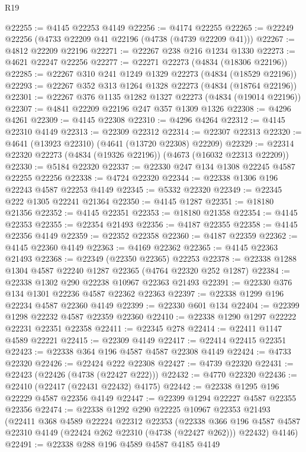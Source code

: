\begin{lexlean}{R19}
\begin{coremodule}
@22255 := @4145 @22253 @4149
@22256 := @4174 @22255
@22265 := @22249 @22256 (@4733 @22209 @41 @22196 (@4738 (@4739 @22209 @41)))
@22267 := @4812 @22209 @22196
@22271 := @22267 @238 @216 @1234 @1330
@22273 := @4621 @22247 @22256
@22277 := @22271 @22273 (@4834 (@18306 @22196))
@22285 := @22267 @310 @241 @1249 @1329 @22273 (@4834 (@18529 @22196))
@22293 := @22267 @352 @313 @1264 @1328 @22273 (@4834 (@18764 @22196))
@22301 := @22267 @376 @1135 @1282 @1327 @22273 (@4834 (@19014 @22196))
@22307 := @4841 @22209 @22196 @247 @357 @1309 @1326
@22308 := @4296 @4261
@22309 := @4145 @22308
@22310 := @4296 @4264
@22312 := @4145 @22310 @4149
@22313 := @22309 @22312
@22314 := @22307 @22313
@22320 := @4641 (@13923 @22310) (@4641 (@13720 @22308) @22209)
@22329 := @22314 @22320 @22273 (@4834 (@19326 @22196)) (@4673 (@16032 @22313 @22209))
@22330 := @5184 @22320
@22337 := @22330 @247 @134 @1308 @22245 @4587 @22255 @22256
@22338 := @4724 @22320
@22344 := @22338 @1306 @196 @22243 @4587 @22253 @4149
@22345 := @5332 @22320
@22349 := @22345 @222 @1305 @22241 @21364
@22350 := @4145 @1287
@22351 := @18180 @21356
@22352 := @4145 @22351
@22353 := @18180 @21358
@22354 := @4145 @22353
@22355 := @22354 @21493
@22356 := @4187 @22355
@22358 := @4145 @22356 @4149
@22359 := @22352 @22358
@22360 := @4187 @22359
@22362 := @4145 @22360 @4149
@22363 := @4169 @22362
@22365 := @4145 @22363 @21493
@22368 := @22349 (@22350 @22365) @22253
@22378 := @22338 @1288 @1304 @4587 @22240 @1287 @22365 (@4764 @22320 @252 @1287)
@22384 := @22338 @1302 @290 @22238 @10967 @22363 @21493
@22391 := @22330 @376 @134 @1301 @22236 @4587 @22362 @22363
@22397 := @22338 @1299 @196 @22234 @4587 @22360 @4149
@22399 := @22330 @601 @134
@22404 := @22399 @1298 @22232 @4587 @22359 @22360
@22410 := @22338 @1290 @1297 @22222 @22231 @22351 @22358
@22411 := @22345 @278
@22414 := @22411 @1147 @4589 @22221
@22415 := @22309 @4149
@22417 := @22414 @22415 @22351
@22423 := @22338 @364 @196 @4587 @4587 @22308 @4149
@22424 := @4733 @22320
@22426 := @22424 @222 @22308
@22427 := @4739 @22320
@22431 := @22423 (@22426 (@4738 (@22427 @222)))
@22432 := @4770 @22320
@22436 := @22410 (@22417 (@22431 @22432) @4175)
@22442 := @22338 @1295 @196 @22229 @4587 @22356 @4149
@22447 := @22399 @1294 @22227 @4587 @22355 @22356
@22474 := @22338
    @1292
    @290
    @22225
    @10967
    @22353
    @21493
    (@22411
      @368
      @4589
      @22224
      @22312
      @22353
      (@22338 @366 @196 @4587 @4587 @22310 @4149 (@22424 @262 @22310 (@4738 (@22427 @262))) @22432)
      @4146)
@22491 := @22338
    @288
    @196
    @4589
    @4587
    @4185
    @4149

\end{coremodule}
\end{lexlean}
